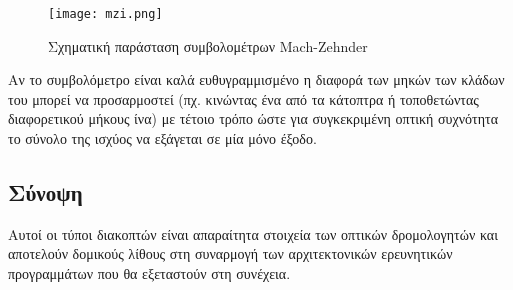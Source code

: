 \begin{figure}[H]
  \centering
  \texttt{[image: mzi.png]}
  \caption{Σχηματική παράσταση συμβολομέτρων Mach-Zehnder}
  \label{fig:mzi}
\end{figure}

Αν το συμβολόμετρο είναι καλά ευθυγραμμισμένο η διαφορά των μηκών των
κλάδων του μπορεί να προσαρμοστεί (πχ. κινώντας ένα από τα κάτοπτρα ή
τοποθετώντας διαφορετικού μήκους ίνα) με τέτοιο τρόπο ώστε για
συγκεκριμένη οπτική συχνότητα το σύνολο της ισχύος να εξάγεται σε μία
μόνο έξοδο.

\subsection{Σύνοψη}

Αυτοί οι τύποι διακοπτών είναι
απαραίτητα στοιχεία των οπτικών δρομολογητών και αποτελούν δομικούς 
λίθους στη συναρμογή των αρχιτεκτονικών ερευνητικών προγραμμάτων
που θα εξεταστούν στη συνέχεια.

